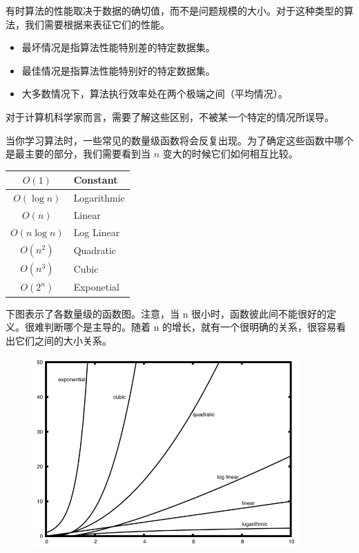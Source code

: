 \begin{frame}\ft{\secname}

  有时算法的性能取决于数据的确切值，而不是问题规模的大小。对于这种类型的算法，我们需要根据来表征它们的性能。

  \begin{itemize}
  \item 最坏情况是指算法性能特别差的特定数据集。
  \item 最佳情况是指算法性能特别好的特定数据集。
  \item 大多数情况下，算法执行效率处在两个极端之间（平均情况）。
  \end{itemize}

  对于计算机科学家而言，需要了解这些区别，不被某一个特定的情况所误导。
\end{frame}

\begin{frame}\ft{\secname}
当你学习算法时，一些常见的数量级函数将会反复出现。为了确定这些函数中哪个是最主要的部分，我们需要看到当 $n$ 变大的时候它们如何相互比较。

\begin{table}[htbp]
\centering
\begin{tabular}{|c|l|}\hline
$O(1)$ & Constant \\[0.1in]\hline
$O(\log n)$ & Logarithmic\\[0.1in]\hline
$O(n)$ & Linear\\[0.1in]\hline
$O(n \log n)$ & Log Linear\\[0.1in]\hline
$O(n^2)$ & Quadratic\\[0.1in]\hline
$O(n^3)$ & Cubic\\[0.1in]\hline
$O(2^n)$ & Exponetial\\[0.1in]\hline
\end{tabular}
\end{table}

\end{frame}

\begin{frame}\ft{\secname}
下图表示了各数量级的函数图。注意，当 n 很小时，函数彼此间不能很好的定义。很难判断哪个是主导的。随着 n 的增长，就有一个很明确的关系，很容易看出它们之间的大小关系。


\begin{figure}[htbp]
        \centering
        \includegraphics[width=4in]{images/newplot.png}
\end{figure}

\end{frame}

